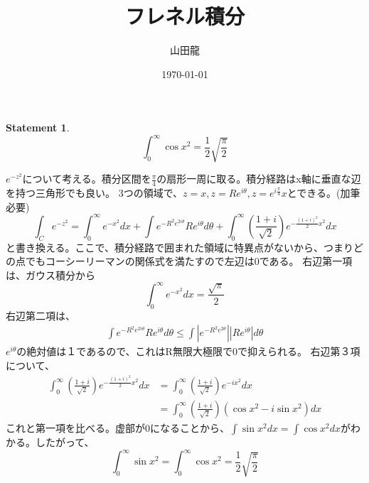 \documentclass{jsarticle}
\date{\today}
\author{山田龍}
\title{フレネル積分}
\newtheorem{th.}{Statement}
\newcommand{\half}{\frac{1}{2}}
\newcommand{\beq}{\begin{equation}}
\newcommand{\eeq}{\end{equation}}
\begin{document}
\maketitle
\begin{th.}
    \beq
    \int_{0}^{\infty} \cos x^2 = \half\sqrt{\frac{\pi}{2}}
    \eeq
\end{th.}
\begin{flushright}\end{flushright}
$e^{-z^2}$について考える。積分区間を$\frac{\pi}{4}$の扇形一周に取る。積分経路はx軸に垂直な辺を持つ三角形でも良い。
3つの領域で、$z = x, z = Re^{i\theta}, z = e^{i\frac{\pi}{4}}x$とできる。(加筆必要)
\beq
\int_C  e^{-z^2} = \int^\infty_0 e^{-x^2} dx+ \int e^{-R^2e^{2i\theta}}Re^{i\theta}d\theta + \int^\infty_0  (\frac{1+i}{\sqrt{2}})e^{-\frac{(1+i)^2}{2}x^2}dx
\eeq
と書き換える。ここで、積分経路で囲まれた領域に特異点がないから、つまりどの点でもコーシーリーマンの関係式を満たすので左辺は0である。
右辺第一項は、ガウス積分から
\beq
\int^\infty_0 e^{-x^2} dx = \frac{\sqrt{\pi}}{2}
\eeq
右辺第二項は、
\begin{align}
\int e^{-R^2e^{2i\theta}}Re^{i\theta}d\theta \leq \int |e^{-R^2e^{2\theta}}||Re^{i\theta}|d\theta
\end{align}
$e^{i\theta}$の絶対値は１であるので、これはR無限大極限で0で抑えられる。
右辺第３項について、
\begin{align}
    \int^\infty_0  (\frac{1+i}{\sqrt{2}})e^{-\frac{(1+i)^2}{2}x^2}dx &= 
\int^\infty_0  (\frac{1+i}{\sqrt{2}})e^{-ix^2}dx\\ 
                                                                     &= \int^\infty_0  (\frac{1+i}{\sqrt{2}})(\cos x^2 - i\sin x^2)dx 
\end{align}
これと第一項を比べる。虚部が0になることから、$\int \sin x^2 dx = \int \cos x^2 dx$がわかる。したがって、
\beq
    \int_{0}^{\infty} \sin x^2 = \int_{0}^{\infty} \cos x^2 = \half\sqrt{\frac{\pi}{2}}
\eeq
\end{document}

